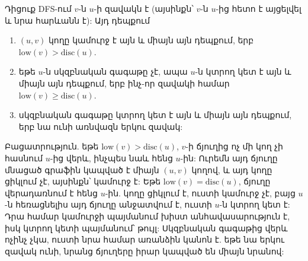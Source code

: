 \begin{theorem}
Դիցուք DFS-ում $v$-ն $u$-ի զավակն է (այսինքն՝ $v$-ն $u$-ից հետո է այցելվել և նրա հարևանն է): Այդ դեպքում
\begin{enumerate}
  \item $(u,v)$ կողը կամուրջ է այն և միայն այն դեպքում, երբ $\mathrm{low}(v)>\mathrm{disc}(u)$.
  \item եթե $u$-ն սկզբնական գագաթը չէ, ապա $u$-ն կտրող կետ է այն և միայն այն դեպքում, երբ ինչ-որ զավակի համար $\mathrm{low}(v)\ge\mathrm{disc}(u)$.
  \item սկզբնական գագաթը կտրող կետ է այն և միայն այն դեպքում, երբ նա ունի առնվազն երկու զավակ:
\end{enumerate}
\end{theorem}

Բացատրություն. եթե $\mathrm{low}(v)>\mathrm{disc}(u)$, $v$-ի ճյուղից ոչ մի կող չի հասնում $u$-ից վերև, ինչպես նաև հենց $u$-ին: Ուրեմն այդ ճյուղը մնացած գրաֆին կապված է միայն $(u,v)$ կողով, և այդ կողը ցիկլում չէ, այսինքն՝ կամուրջ է: Եթե $\mathrm{low}(v)=\mathrm{disc}(u)$, ճյուղը վերադառնում է հենց $u$-ին. կողը ցիկլում է, ուստի կամուրջ չէ, բայց $u$-ն հեռացնելիս այդ ճյուղը անջատվում է, ուստի $u$-ն կտրող կետ է: Դրա համար կամուրջի պայմանում խիստ անհավասարություն է, իսկ կտրող կետի պայմանում՝ թույլ: Սկզբնական գագաթից վերև ոչինչ չկա, ուստի նրա համար առանձին կանոն է. եթե նա երկու զավակ ունի, նրանց ճյուղերը իրար կապված են միայն նրանով:

